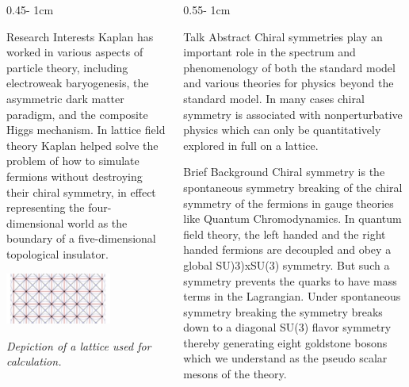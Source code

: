 \documentclass{../psuposter}
\begin{document}
\begin{frame}
\begin{columns}[t, totalwidth=\textwidth]
\begin{column}{0.45\textwidth - 1cm}
    \begin{block}{Research Interests}
        Kaplan has worked in various aspects of particle theory, including electroweak baryogenesis, the asymmetric dark matter paradigm, and the composite Higgs mechanism. In lattice field theory Kaplan helped solve the problem of how to simulate fermions without destroying their chiral symmetry, in effect representing the four-dimensional world as the boundary of a five-dimensional topological insulator. 
        \begin{center}
	    	\includegraphics[width=0.65\textwidth]{images/research}    		

    	\textit{Depiction of a lattice used for calculation.} 
    	\end{center}

    \end{block}
\end{column}
\begin{column}{0.55\textwidth - 1cm}


    \begin{block}{Talk Abstract}
    	Chiral symmetries play an important role in the spectrum and phenomenology of both the standard model and various theories for physics beyond the standard model. In many cases chiral symmetry is associated with nonperturbative physics which can only be quantitatively explored in full on a lattice.
    \end{block}


    \begin{block}{Brief Background}
    	Chiral symmetry is the spontaneous symmetry breaking of the chiral symmetry of the fermions in gauge theories like Quantum Chromodynamics. 
    	In quantum field theory, the left handed and the right handed fermions are decoupled and obey a global SU)3)xSU(3) symmetry. But such a symmetry prevents the quarks to have mass terms in the Lagrangian. Under spontaneous symmetry breaking the symmetry breaks down to a diagonal SU(3) flavor symmetry thereby generating eight goldstone bosons which we understand as the pseudo scalar mesons of the theory. \cite{kaplanChiralSymmetryLattice2012}
  

\end{block}
\end{column}
\end{columns}
\end{frame}
\end{document}
